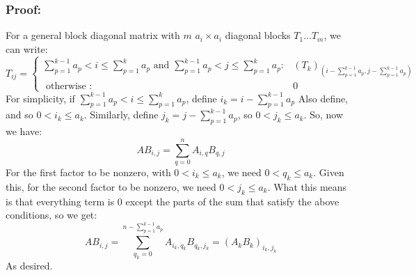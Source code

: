 \documentclass{article}
\begin{document}
\subsubsection*{Proof:}
For a general block diagonal matrix with $m$ $a_{i} \times a_{i}$ diagonal blocks $T_{1} ... T_{m}$, we can write:
\[T_{ij} = \begin{cases}
\sum_{p=1}^{k-1}a_{p} < i \leq \sum_{p=1}^{k}a_{p} \text{ and } \sum_{p=1}^{k-1}a_{p} < j \leq \sum_{p=1}^{k}a_{p}: & (T_{k})_{(i - \sum_{p=1}^{k-1}a_{p}, j - \sum_{p=1}^{k-1}a_{p})}\\
\text{ otherwise }: & 0
\end{cases}
\]
For simplicity, if $\sum_{p=1}^{k-1}a_{p} < i \leq \sum_{p=1}^{k}a_{p}$, define $i_{k}=i - \sum_{p=1}^{k-1}a_{p}$ Also define, and so $ 0 < i_{k} \leq a_{k}$. Similarly, define $j_{k} = j - \sum_{p=1}^{k-1}a_{p}$, so $ 0 < j_{k} \leq a_{k}$.
So, now we have:
\[AB_{i,j} = \sum_{q=0}^{n} A_{i,q}B_{q, j}
\]
For the first factor to be nonzero, with $0 < i_{k} \leq a_{k}$, we need $0 < q_{k} \leq a_{k}$. Given this, for the second factor to be nonzero, we need $0< j_{k} \leq a_{k}$. What this means is that everything term is 0 except the parts of the sum that satisfy the above conditions, so we get:
\[
AB_{i, j} = \sum_{q_k = 0}^{n-\sum_{p=1}^{k-1}a_{p}} A_{i_{k},q_{k}}B_{q_{k}, j_{k}} = (A_{k}B_{k})_{i_{k},j_{k}}
\]
As desired. 
\end{document}
